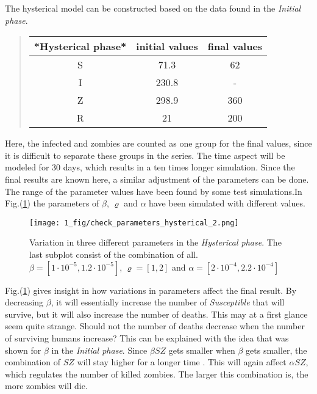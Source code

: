 \documentclass[%
twoside,                 %
final,                   %
chapterprefix=true,      %
open=right               %
10pt]{book}
\begin{document}
\vspace{3mm}




\vspace{3mm}


The hysterical model can be constructed based on the data found in the \emph{Initial phase}. 


\begin{quote}
\begin{tabular}{ccc}
\hline
\multicolumn{1}{c}{ *Hysterical phase* } & \multicolumn{1}{c}{ initial values } & \multicolumn{1}{c}{ final values } \\
\hline
S                  & 71.3           & 62           \\
I                  & 230.8          & -            \\
Z                  & 298.9          & 360          \\
R                  & 21             & 200          \\
\hline
\end{tabular}
\end{quote}

\noindent
Here, the infected and zombies are counted as one group for the final values, since it is difficult to separate these groups in the series. The time aspect will be modeled for 30 days, which results in a ten times longer simulation. Since the final results are known here, a similar adjustment of the parameters can be done. The range of the parameter values have been found by some test simulations.In Fig.(\ref{fig:hysterical_variations}) the parameters of $\beta$, $\varrho$ and $\alpha$ have been simulated with different values. 


\begin{figure}[ht]
  \centerline{\texttt{[image: 1\_fig/check\_parameters\_hysterical\_2.png]}}
  \caption{
  \label{fig:hysterical_variations} Variation in three different parameters in the \emph{Hysterical phase}. The last subplot consist of the combination of all. $\beta=[1\cdot10^{-5},1.2\cdot10^{-5}]$, $\varrho=[1,2]$ and $\alpha=[2\cdot10^{-4},2.2\cdot10^{-4}]$
  }
\end{figure}


Fig.(\ref{fig:hysterical_variations}) gives insight in how variations in parameters affect the final result. By decreasing $\beta$, it will essentially increase the number of \emph{Susceptible} that will survive, but it will also increase the number of deaths. This may at a first glance seem quite strange. Should not the number of deaths decrease when the number of surviving humans increase? This can be explained with the idea that was shown for $\beta$ in the \emph{Initial phase}. Since $\beta SZ$ gets smaller when $\beta$ gets smaller, the combination of $SZ$ will stay higher for a longer time . This will again affect $\alpha SZ$, which regulates the number of killed zombies. The larger this combination is, the more zombies will die. 
\end{document}
